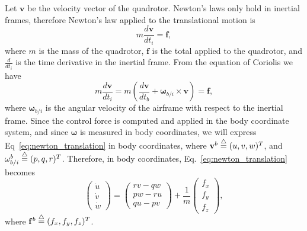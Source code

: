 {Let $\mathbf{v}$ be the velocity vector of the quadrotor. Newton's
laws only hold in inertial frames, therefore Newton's law applied to
the translational motion is
\[
m \frac{d\mathbf{v}}{dt_i} =  \mathbf{f},
\]
where $m$ is the mass of the quadrotor, $\mathbf{f}$ is the total
applied to the quadrotor, and $\frac{d}{dt_i}$ is the time
derivative in the inertial frame.  From the equation of Coriolis we
have
\begin{equation} \label{eq:newton_translation}
m \frac{d\mathbf{v}}{dt_i}
    = m \left(
        \frac{d\mathbf{v}}{dt_b} + \boldsymbol{\omega}_{b/i}\times\mathbf{v}
         \right) = \mathbf{f},
\end{equation}
where $\boldsymbol{\omega}_{b/i}$ is the angular velocity of the
airframe with respect to the inertial frame.  Since the control
force is computed and applied in the body coordinate system, and
since $\boldsymbol{\omega}$ is measured in body coordinates, we will
express Eq~\eqref{eq:newton_translation} in body coordinates, where
$\mathbf{v}^b \stackrel{\triangle}{=} (u, v, w)^T$, and $\omega^b_{b/i} \stackrel{\triangle}{=} (p, q,
r)^T$.  Therefore, in body coordinates,
Eq.~\eqref{eq:newton_translation} becomes
\begin{equation} \label{eq:kin-translational-dynamics}
\begin{pmatrix} \dot{u} \\ \dot{v} \\ \dot{w} \end{pmatrix}
= \begin{pmatrix} rv-qw \\ pw-ru \\ qu-pv \end{pmatrix} +
\frac{1}{m} \begin{pmatrix} f_x \\ f_y \\ f_z \end{pmatrix},
\end{equation}
where $\mathbf{f}^b \stackrel{\triangle}{=} (f_x,  f_y, f_z)^T$.

}
